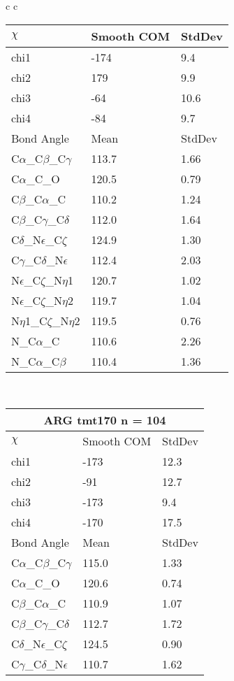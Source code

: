 \begin{longtable}{ c c }
\begin{tabular}{ l l l }
  $\chi$       & Smooth COM & StdDev \\ \midrule
  chi1 & -174 & 9.4 \\ 
  chi2 & 179 & 9.9 \\ 
  chi3 & -64 & 10.6 \\ 
  chi4 & -84 & 9.7 \\ \midrule
  Bond Angle   & Mean     & StdDev \\ \midrule
  C$\alpha$\_C$\beta$\_C$\gamma$ & 113.7 & 1.66\\
  C$\alpha$\_C\_O & 120.5 & 0.79\\
  C$\beta$\_C$\alpha$\_C & 110.2 & 1.24\\
  C$\beta$\_C$\gamma$\_C$\delta$ & 112.0 & 1.64\\
  C$\delta$\_N$\epsilon$\_C$\zeta$ & 124.9 & 1.30\\
  C$\gamma$\_C$\delta$\_N$\epsilon$ & 112.4 & 2.03\\
  N$\epsilon$\_C$\zeta$\_N$\eta$1 & 120.7 & 1.02\\
  N$\epsilon$\_C$\zeta$\_N$\eta$2 & 119.7 & 1.04\\
  N$\eta$1\_C$\zeta$\_N$\eta$2 & 119.5 & 0.76\\
  N\_C$\alpha$\_C & 110.6 & 2.26\\
  N\_C$\alpha$\_C$\beta$ & 110.4 & 1.36\\
  \bottomrule
  \end{tabular}
  \\
  \begin{tabular}{ l l l }
  \toprule
  \multicolumn{3}{c}{ARG \textbf{tmt170} n = 104} \\ \toprule
  $\chi$       & Smooth COM & StdDev \\ \midrule
  chi1 & -173 & 12.3 \\ 
  chi2 & -91 & 12.7 \\ 
  chi3 & -173 & 9.4 \\ 
  chi4 & -170 & 17.5 \\ \midrule
  Bond Angle   & Mean     & StdDev \\ \midrule
  C$\alpha$\_C$\beta$\_C$\gamma$ & 115.0 & 1.33\\
  C$\alpha$\_C\_O & 120.6 & 0.74\\
  C$\beta$\_C$\alpha$\_C & 110.9 & 1.07\\
  C$\beta$\_C$\gamma$\_C$\delta$ & 112.7 & 1.72\\
  C$\delta$\_N$\epsilon$\_C$\zeta$ & 124.5 & 0.90\\
  C$\gamma$\_C$\delta$\_N$\epsilon$ & 110.7 & 1.62\\

\end{tabular}
\end{longtable}
